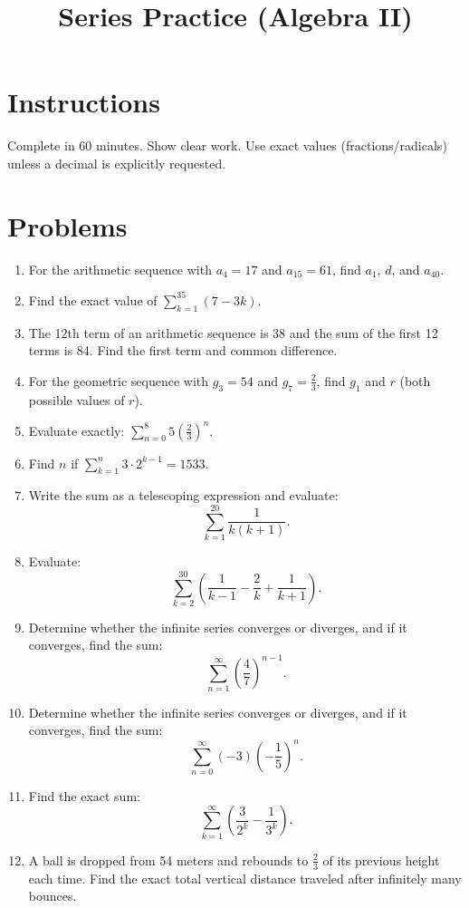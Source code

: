 \documentclass[12pt]{article}
\title{Series Practice (Algebra II)}
\author{}
\date{}
\begin{document}
\maketitle

\section*{Instructions}
Complete in 60 minutes. Show clear work. Use exact values (fractions/radicals) unless a decimal is explicitly requested.

\section*{Problems}
\begin{enumerate}
  \item For the arithmetic sequence with $a_4=17$ and $a_{15}=61$, find $a_1$, $d$, and $a_{40}$.
  \item Find the exact value of $\sum_{k=1}^{35}\left(7-3k\right)$.
  \item The 12th term of an arithmetic sequence is 38 and the sum of the first 12 terms is 84. Find the first term and common difference.
  \item For the geometric sequence with $g_3=54$ and $g_7=\frac{2}{3}$, find $g_1$ and $r$ (both possible values of $r$).
  \item Evaluate exactly: $\sum_{n=0}^{8} 5\left(\frac{2}{3}\right)^n$.
  \item Find $n$ if $\sum_{k=1}^{n} 3\cdot 2^{k-1}=1533$.
  \item Write the sum as a telescoping expression and evaluate:
  \[
  \sum_{k=1}^{20}\frac{1}{k(k+1)}.
  \]
  \item Evaluate:
  \[
  \sum_{k=2}^{30}\left(\frac{1}{k-1}-\frac{2}{k}+\frac{1}{k+1}\right).
  \]
  \item Determine whether the infinite series converges or diverges, and if it converges, find the sum:
  \[
  \sum_{n=1}^{\infty}\left(\frac{4}{7}\right)^{n-1}.
  \]
  \item Determine whether the infinite series converges or diverges, and if it converges, find the sum:
  \[
  \sum_{n=0}^{\infty}(-3)\left(-\frac{1}{5}\right)^n.
  \]
  \item Find the exact sum:
  \[
  \sum_{k=1}^{\infty}\left(\frac{3}{2^{k}}-\frac{1}{3^{k}}\right).
  \]
  \item A ball is dropped from 54 meters and rebounds to $\frac{2}{3}$ of its previous height each time. Find the exact total vertical distance traveled after infinitely many bounces.
\end{enumerate}
\end{document}

